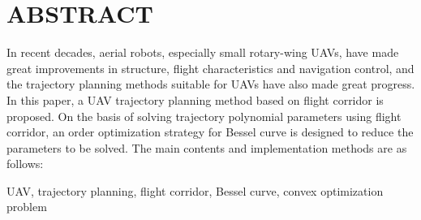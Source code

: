 ﻿\renewcommand{\baselinestretch}{1.25}
\fontsize{12pt}{12.5pt}\selectfont%

\chapter*{\sSanhao \textbf{ABSTRACT}}

  
In recent decades, aerial robots, especially small rotary-wing UAVs, have made great improvements in structure, flight characteristics and navigation control, and the trajectory planning methods suitable for UAVs have also made great progress. In this paper, a UAV trajectory planning method based on flight corridor is proposed. On the basis of solving trajectory polynomial parameters using flight corridor, an order optimization strategy for Bessel curve is designed to reduce the parameters to be solved. The main contents and implementation methods are as follows:


\vspace{1em}
 UAV, trajectory planning, flight corridor, Bessel curve, convex optimization problem

\clearpage
\endinput